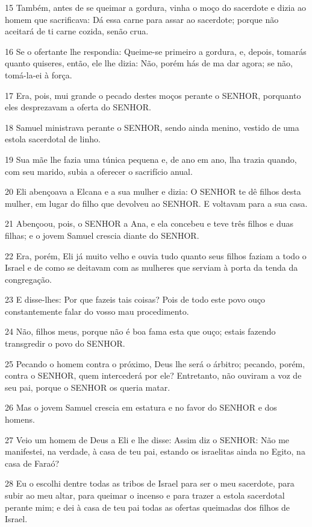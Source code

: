 \par 15 Também, antes de se queimar a gordura, vinha o moço do sacerdote e dizia ao homem que sacrificava: Dá essa carne para assar ao sacerdote; porque não aceitará de ti carne cozida, senão crua.
\par 16 Se o ofertante lhe respondia: Queime-se primeiro a gordura, e, depois, tomarás quanto quiseres, então, ele lhe dizia: Não, porém hás de ma dar agora; se não, tomá-la-ei à força.
\par 17 Era, pois, mui grande o pecado destes moços perante o SENHOR, porquanto eles desprezavam a oferta do SENHOR.
\par 18 Samuel ministrava perante o SENHOR, sendo ainda menino, vestido de uma estola sacerdotal de linho.
\par 19 Sua mãe lhe fazia uma túnica pequena e, de ano em ano, lha trazia quando, com seu marido, subia a oferecer o sacrifício anual.
\par 20 Eli abençoava a Elcana e a sua mulher e dizia: O SENHOR te dê filhos desta mulher, em lugar do filho que devolveu ao SENHOR. E voltavam para a sua casa.
\par 21 Abençoou, pois, o SENHOR a Ana, e ela concebeu e teve três filhos e duas filhas; e o jovem Samuel crescia diante do SENHOR.
\par 22 Era, porém, Eli já muito velho e ouvia tudo quanto seus filhos faziam a todo o Israel e de como se deitavam com as mulheres que serviam à porta da tenda da congregação.
\par 23 E disse-lhes: Por que fazeis tais coisas? Pois de todo este povo ouço constantemente falar do vosso mau procedimento.
\par 24 Não, filhos meus, porque não é boa fama esta que ouço; estais fazendo transgredir o povo do SENHOR.
\par 25 Pecando o homem contra o próximo, Deus lhe será o árbitro; pecando, porém, contra o SENHOR, quem intercederá por ele? Entretanto, não ouviram a voz de seu pai, porque o SENHOR os queria matar.
\par 26 Mas o jovem Samuel crescia em estatura e no favor do SENHOR e dos homens.
\par 27 Veio um homem de Deus a Eli e lhe disse: Assim diz o SENHOR: Não me manifestei, na verdade, à casa de teu pai, estando os israelitas ainda no Egito, na casa de Faraó?
\par 28 Eu o escolhi dentre todas as tribos de Israel para ser o meu sacerdote, para subir ao meu altar, para queimar o incenso e para trazer a estola sacerdotal perante mim; e dei à casa de teu pai todas as ofertas queimadas dos filhos de Israel.
